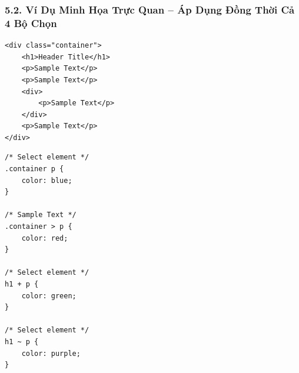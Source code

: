 \subsubsection{5.2. Ví Dụ Minh Họa Trực Quan -- Áp Dụng Đồng Thời Cả 4 Bộ Chọn}

\begin{codeWindow}
\begin{lstlisting}[language=HTML5]
<div class="container">
    <h1>Header Title</h1>
    <p>Sample Text</p>
    <p>Sample Text</p>
    <div>
        <p>Sample Text</p>
    </div>
    <p>Sample Text</p>
</div>
\end{lstlisting}
\end{codeWindow}

\begin{codeWindow}
\begin{lstlisting}[language=CSS3]
/* Select element */
.container p {
    color: blue;
}

/* Sample Text */
.container > p {
    color: red;
}

/* Select element */
h1 + p {
    color: green;
}

/* Select element */
h1 ~ p {
    color: purple;
}
\end{lstlisting}
\end{codeWindow}

